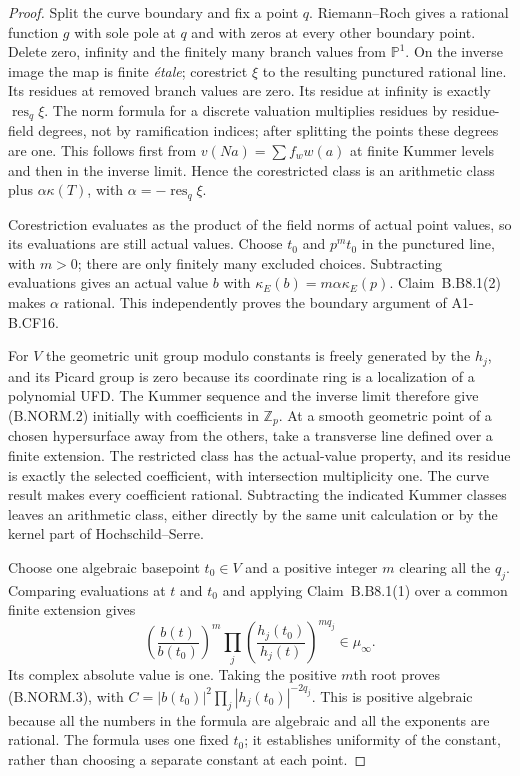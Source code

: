 \begin{proof}
Split the curve boundary and fix a point $q$.  Riemann--Roch gives
a rational function $g$ with sole pole at $q$ and with zeros at
every other boundary point.  Delete zero, infinity and the finitely
many branch values from $\mathbb P^1$.  On the inverse image the
map is finite \emph{\'etale}; corestrict $\xi$ to the resulting
punctured rational line.  Its residues at removed branch values are
zero.  Its residue at infinity is exactly $\operatorname{res}_q\xi$.
The norm formula for a discrete valuation multiplies residues by
residue-field degrees, not by ramification indices; after splitting
the points these degrees are one.  This follows first from
$v(Na)=\sum f_w w(a)$ at finite Kummer levels and then in the
inverse limit.  Hence the corestricted class is an arithmetic class
plus $\alpha\kappa(T)$, with
$\alpha=-\operatorname{res}_q\xi$.

Corestriction evaluates as the product of the field norms of actual
point values, so its evaluations are still actual values.  Choose
$t_0$ and $p^m t_0$ in the punctured line, with $m>0$; there are
only finitely many excluded choices.  Subtracting evaluations gives
an actual value $b$ with
$\kappa_E(b)=m\alpha\kappa_E(p)$.  Claim~B.B8.1(2) makes
$\alpha$ rational.  This independently proves the boundary argument
of A1-B.CF16.

For $V$ the geometric unit group modulo constants is freely
generated by the $h_j$, and its Picard group is zero because its
coordinate ring is a localization of a polynomial UFD.  The Kummer
sequence and the inverse limit therefore give (B.NORM.2) initially
with coefficients in $\mathbb Z_p$.  At a smooth geometric point
of a chosen hypersurface away from the others, take a transverse
line defined over a finite extension.  The restricted class has
the actual-value property, and its residue is exactly the selected
coefficient, with intersection multiplicity one.  The curve result
makes every coefficient rational.  Subtracting the indicated Kummer
classes leaves an arithmetic class, either directly by the same
unit calculation or by the kernel part of Hochschild--Serre.

Choose one algebraic basepoint $t_0\in V$ and a positive integer
$m$ clearing all the $q_j$.  Comparing evaluations at $t$ and
$t_0$ and applying Claim~B.B8.1(1) over a common finite extension
gives
\[
 \left(\frac{b(t)}{b(t_0)}\right)^m
       \prod_j\left(\frac{h_j(t_0)}{h_j(t)}\right)^{mq_j}
       \in\mu_\infty.
\]
Its complex absolute value is one.  Taking the positive $m$th root
proves (B.NORM.3), with
$C=|b(t_0)|^2\prod_j|h_j(t_0)|^{-2q_j}$.
This is positive algebraic because all the numbers in the formula
are algebraic and all the exponents are rational.  The formula
uses one fixed $t_0$; it establishes uniformity of the constant,
rather than choosing a separate constant at each point.
\end{proof}

